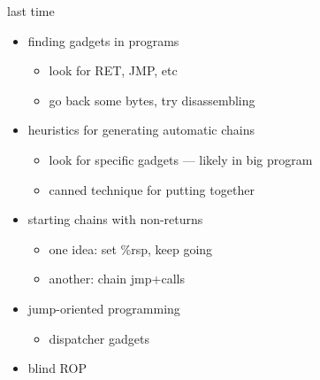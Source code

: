 \date{}
\title{}
\date{}

\begin{frame}
    \titlepage
\end{frame}



\usetikzlibrary{arrows.meta,patterns}

\begin{frame}{last time}
    \begin{itemize}
    \item finding gadgets in programs
        \begin{itemize}
        \item look for RET, JMP, etc
        \item go back some bytes, try disassembling
        \end{itemize}
    \item heuristics for generating automatic chains
        \begin{itemize}
        \item look for specific gadgets --- likely in big program
        \item canned technique for putting together
        \end{itemize}
    \item starting chains with non-returns
        \begin{itemize}
        \item one idea: set \%rsp, keep going
        \item another: chain jmp+calls
        \end{itemize}
    \item jump-oriented programming
        \begin{itemize}
        \item dispatcher gadgets
        \end{itemize}
    \item blind ROP
    \end{itemize}
\end{frame}

